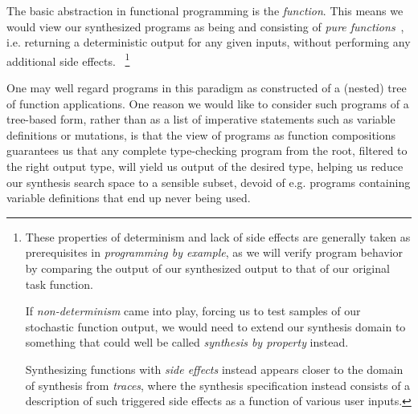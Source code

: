 \documentclass{article}
\begin{document}
The basic abstraction in functional programming is the \emph{function}.
This means we would view our synthesized programs as being and consisting of \emph{pure functions}~\citep{fortran95},
i.e. returning a deterministic output for any given inputs,
without performing any additional side effects.%
~\footnote{
    These properties of determinism and lack of side effects are generally taken as prerequisites in \emph{programming by example},
    as we will verify program behavior by comparing the output of our synthesized output to that of our original task function.

    If \emph{non-determinism} came into play,
    forcing us to test samples of our stochastic function output,
    we would need to extend our synthesis domain to something that could well be called \emph{synthesis by property} instead.

    Synthesizing functions with \emph{side effects} instead appears closer to the domain of synthesis from \emph{traces},
    where the synthesis specification instead consists of a description of such triggered side effects as a function of various user inputs.
}


One may well regard programs in this paradigm as constructed of a (nested) tree of function applications.
One reason we would like to consider such programs of a tree-based form,
rather than as a list of imperative statements such as variable definitions or mutations,
is that the view of programs as function compositions guarantees us that any complete type-checking program from the root,
filtered to the right output type,
will yield us output of the desired type,%
helping us reduce our synthesis search space to a sensible subset,
devoid of e.g. programs containing variable definitions that end up never being used.
\end{document}
